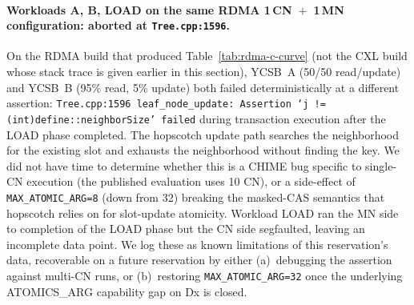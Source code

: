 \documentclass[11pt,a4paper]{article}
\begin{document}
\paragraph{Workloads A, B, LOAD on the same RDMA 1\,CN~$+$~1\,MN configuration: aborted at \texttt{Tree.cpp:1596}.} On the RDMA build that produced Table~\ref{tab:rdma-c-curve} (not the CXL build whose stack trace is given earlier in this section), YCSB~A (50/50 read/update) and YCSB~B (95\% read, 5\% update) both failed deterministically at a different assertion: \texttt{Tree.cpp:1596 leaf\_node\_update: Assertion `j != (int)define::neighborSize' failed} during transaction execution after the LOAD phase completed. The hopscotch update path searches the neighborhood for the existing slot and exhausts the neighborhood without finding the key. We did not have time to determine whether this is a CHIME bug specific to single-CN execution (the published evaluation uses 10 CN), or a side-effect of \texttt{MAX\_ATOMIC\_ARG=8} (down from 32) breaking the masked-CAS semantics that hopscotch relies on for slot-update atomicity. Workload LOAD ran the MN side to completion of the LOAD phase but the CN side segfaulted, leaving an incomplete data point. We log these as known limitations of this reservation's data, recoverable on a future reservation by either (a)~debugging the assertion against multi-CN runs, or (b)~restoring \texttt{MAX\_ATOMIC\_ARG=32} once the underlying ATOMICS\_ARG capability gap on Dx is closed.
\end{document}
